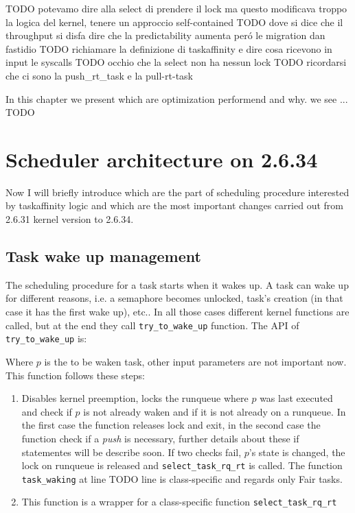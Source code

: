 TODO potevamo dire alla select di prendere il lock ma questo modificava troppo la logica del kernel, tenere un approccio self-contained
TODO dove si dice che il throughput si disfa dire che la predictability aumenta per\'o le migration dan fastidio
TODO richiamare la definizione di taskaffinity e dire cosa ricevono in input le syscalls
TODO occhio che la select non ha nessun lock
TODO ricordarsi che ci sono la push\_rt\_task e la pull-rt-task

In this chapter we present which are optimization performend and why. we see ... TODO 

\section{Scheduler architecture on 2.6.34}

Now I will briefly introduce which are the part of scheduling procedure interested by taskaffinity logic and which are the most important changes carried 
out from 2.6.31 kernel version to 2.6.34.

\subsection{Task wake up management}

The scheduling procedure for a task starts when it wakes up. A task can wake up
for different reasons, i.e. a semaphore becomes unlocked, task's creation
(in that case it has the first wake up), etc.. In all those cases different
kernel functions are called, but at the end they call 
\texttt{try\_to\_wake\_up} function. The API of \texttt{try\_to\_wake\_up} is:

\lstset{basicstyle=\footnotesize, language=c, captionpos=b, frame=single, label=lis:API\_ttwu}


Where $p$ is the to be waken task, other input parameters are not important now.
This function follows these steps:

\begin{enumerate}
\item Disables kernel preemption, locks the runqueue where $p$ was last executed and check 
if $p$ is not already waken and if it is not already on a runqueue. In the first case the 
function releases lock and exit, in the second case the function check if a
\textit{push} is necessary, further details about these if statementes will be
describe soon. If two checks fail, $p$'s state is changed, the lock on runqueue
is released and \texttt{select\_task\_rq\_rt} is called. The function
\texttt{task\_waking} at line TODO line is class-specific and regards only Fair
tasks. 


\lstset{basicstyle=\footnotesize, language=c, captionpos=b, frame=single,label=lis:steps}


\item This function is a wrapper for a class-specific function
\texttt{select\_task\_rq\_rt} 

\end{enumerate}

